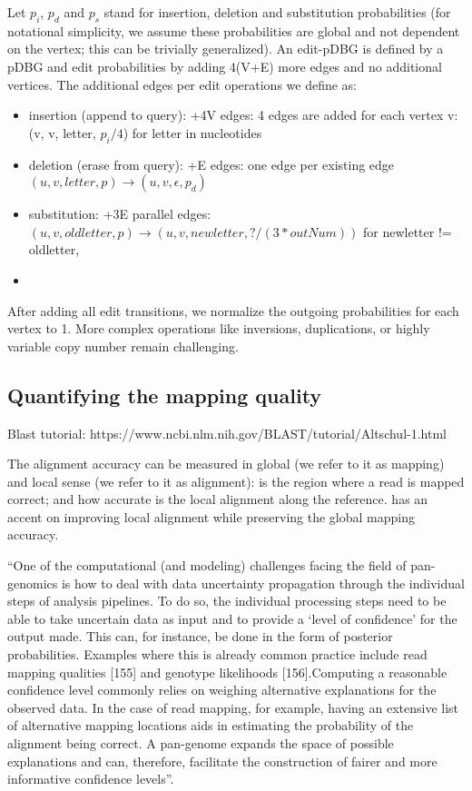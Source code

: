 Let $p_i$, $p_d$ and $p_s$ stand for insertion, deletion and substitution probabilities (for notational simplicity, we assume these probabilities are global and not dependent on the vertex; this can be trivially generalized). An edit-pDBG is defined by a pDBG and edit probabilities by adding 4(V+E) more edges and no additional vertices. The additional edges per edit operations we define as:
\begin{itemize}
	\item insertion (append to query): +4V edges: 4 edges are added for each vertex v: (v, v, letter, $p_i/4$) for letter in nucleotides
	\item deletion (erase from query): +E edges: one edge per existing edge $(u, v, letter, p) \to (u, v, \epsilon, p_d)$
	\item substitution: +3E parallel edges: $(u, v, oldletter, p) \to (u, v, newletter, ?/(3*outNum))$ for newletter != oldletter, 
	\item {}
\end{itemize}

After adding all edit transitions, we normalize the outgoing probabilities for each vertex to 1. More complex operations like inversions, duplications, or highly variable copy number remain challenging.

\subsection{Quantifying the mapping quality}

Blast tutorial: https://www.ncbi.nlm.nih.gov/BLAST/tutorial/Altschul-1.html

The alignment accuracy can be measured in global (we refer to it as mapping) and local sense (we refer to it as alignment): is the region where a read is mapped correct; and how accurate is the local alignment along the reference\cite{frith2010parameters}. \tool has an accent on improving local alignment while preserving the global mapping accuracy.

``One of the computational (and modeling) challenges facing the field of pan-genomics is how to deal with data uncertainty propagation through the individual steps of analysis pipelines. To do so, the individual processing steps need to be able to take uncertain data as input and to provide a ‘level of confidence’ for the output made. This can, for instance, be done in the form of posterior probabilities. Examples where this is already common practice include read mapping qualities [155] and genotype likelihoods [156].Computing a reasonable confidence level commonly relies on weighing alternative explanations for the observed data. In the case of read mapping, for example, having an extensive list of alternative mapping locations aids in estimating the probability of the alignment being correct. A pan-genome expands the space of possible explanations and can, therefore, facilitate the construction of fairer and more informative confidence levels''\cite{computational2016pengenomics}.

